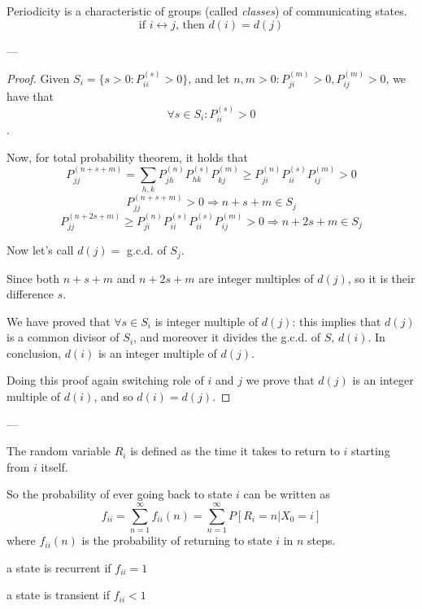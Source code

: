 	\begin{theorem} Periodicity is a characteristic of groups (called \emph{classes}) of communicating states.
		$$\text{if } i \leftrightarrow j \text{, then } d(i) = d(j)$$
	\end{theorem}
	---

	\begin{proof}
		Given $S_i = \{ s>0 : P_{ii}^{(s)} >0 \}$, and let $n, m >0 : P_{ji}^{(m)} >0, P_{ij}^{(m)} > 0$, we have that $$\forall s \in S_i : P_{ii}^{(s)} > 0$$.

		Now, for total probability theorem, it holds that
		$$P_{jj}^{(n+s+m)} = \sum_{h, k} P_{jh}^{(n)} P_{hk}^{(s)} P_{kj}^{(m)} \geq P_{ji}^{(n)} P_{ii}^{(s)} P_{ij}^{(m)} >0 $$
		$$P_{jj}^{(n+s+m)} >0 \Rightarrow n+s+m \in S_j$$
		$$P_{jj}^{(n+2s+m)} \geq P_{ji}^{(n)} P_{ii}^{(s)} P_{ii}^{(s)} P_{ij}^{(m)} >0 \Rightarrow n+2s+m \in S_j$$

		Now let's call $d(j) =$ g.c.d. of $S_j$.

		Since both $n+s+m$ and $n+2s+m$ are integer multiples of $d(j)$, so it is their difference $s$.

		We have proved that $\forall s \in S_i$ is integer multiple of $d(j)$: this implies that $d(j)$ is a common divisor of $S_i$, and moreover it divides the g.c.d. of $S$, $d(i)$. In conclusion, $d(i)$ is an integer multiple of $d(j)$.

		Doing this proof again switching role of $i$ and $j$ we prove that $d(j)$ is an integer multiple of $d(i)$, and so $d(i) = d(j)$.
	\end{proof}
	---

	\begin{definition}
		The random variable $R_i$ is defined as the time it takes to return to $i$ starting from $i$ itself.
	\end{definition}

	So the probability of ever going back to state $i$ can be written as
	$$ f_{ii} = \sum_{n=1}^\infty f_{ii}(n)  = \sum_{n=1}^\infty P[R_i=n | X_0=i] $$
	where $f_{ii}(n)$ is the probability of returning to state $i$ in $n$ steps.

	\begin{definition}
		a state is recurrent if $f_{ii} = 1$
	\end{definition}

	\begin{definition}
		a state is transient if  $f_{ii} < 1$
	\end{definition}

